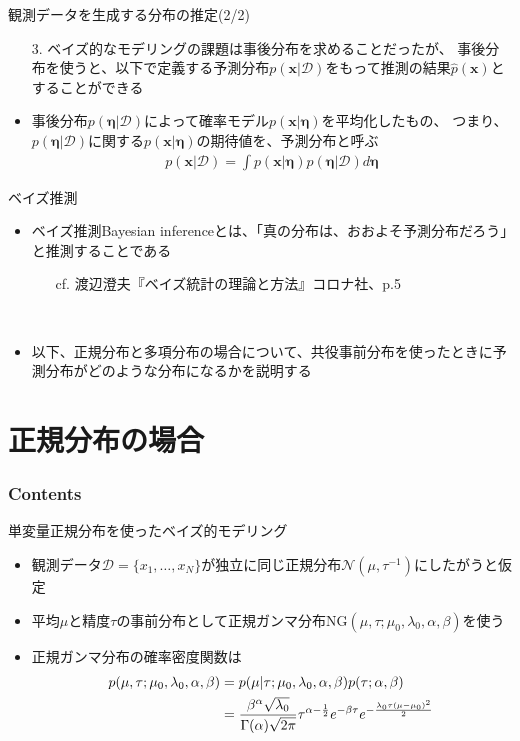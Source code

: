 \documentclass[aspectratio=169,unicode,dvipdfmx,14pt]{beamer}
\begin{document}
\begin{frame}{観測データを生成する分布の推定(2/2)}
\begin{itemize}
\item[3.] ベイズ的なモデリングの課題は事後分布を求めることだったが、
事後分布を使うと、以下で定義する予測分布$p(\bm{x}|\mathcal{D})$をもって推測の結果$\hat{p}(\bm{x})$とすることができる
\item 事後分布$p(\bm{\eta} | \mathcal{D})$によって確率モデル$p(\bm{x}|\bm{\eta})$を平均化したもの、
つまり、$p(\bm{\eta} | \mathcal{D})$に関する$p(\bm{x}|\bm{\eta})$の期待値を、予測分布と呼ぶ
\begin{align}
p(\bm{x}|\mathcal{D}) = \int p(\bm{x}|\bm{\eta}) p(\bm{\eta} | \mathcal{D}) d\bm{\eta}
\label{eq:predictive}
\end{align}
\end{itemize}
\end{frame}

\begin{frame}{ベイズ推測}
\begin{itemize}
\item ベイズ推測Bayesian inferenceとは、「真の分布は、おおよそ予測分布だろう」と推測することである
\begin{itemize}
\item[cf.] 渡辺澄夫『ベイズ統計の理論と方法』コロナ社、p.5
\end{itemize}
\item[] \ 
\item 以下、正規分布と多項分布の場合について、共役事前分布を使ったときに予測分布がどのような分布になるかを説明する
\end{itemize}
\end{frame}

\section{正規分布の場合}

\begin{frame}\frametitle{Contents}
\Large \tableofcontents[currentsection]
\end{frame}

\begin{frame}{単変量正規分布を使ったベイズ的モデリング}
\begin{itemize}
\item 観測データ$\mathcal{D}=\{x_1,\ldots,x_N\}$が独立に同じ正規分布$\mathcal{N}(\mu,\tau^{-1})$にしたがうと仮定
\item 平均$\mu$と精度$\tau$の事前分布として正規ガンマ分布$\mbox{NG}(\mu,\tau;\mu_0, \lambda_0, \alpha, \beta)$を使う
\item 正規ガンマ分布の確率密度関数は
\begin{align}
p(\mu, \tau ; \mu_0, \lambda_0, \alpha, \beta)
& = p(\mu | \tau ; \mu_0, \lambda_0, \alpha, \beta) p(\tau ; \alpha, \beta)
\notag \\ &
= \frac{\beta^\alpha\sqrt{\lambda_0}}{\Gamma(\alpha)\sqrt{2\pi}}
\tau^{\alpha-\frac{1}{2}}e^{-\beta\tau}e^{-\frac{\lambda_0\tau(\mu - \mu_0)^2}{2}}
\end{align}
\end{itemize}
\end{frame}
\end{document}
